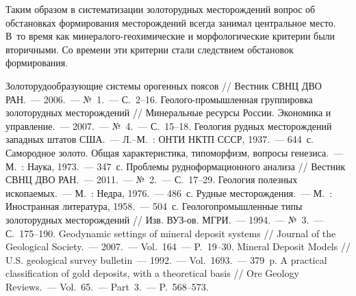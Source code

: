 Таким образом в систематизации золоторудных месторождений вопрос об обстановках формирования месторождений всегда занимал центральное место. В~то время как минералого-геохимические и морфологические критерии были вторичными. Со времени эти критерии стали следствием обстановок формирования.

\begin{thebibliography}{99}
\bibitem{} Золоторудообразующие системы орогенных поясов // Вестник СВНЦ ДВО РАН.~--- 2006.~--- №~1.~--- С.~2--16.
\bibitem{} Геолого-промышленная группировка золоторудных месторождений // Минеральные ресурсы России. Экономика и управление.~--- 2007.~--- №~4.~--- С.~15--18.
\bibitem{} Геология рудных месторождений западных штатов США.~--- Л.--М.~: ОНТИ НКТП СССР, 1937.~--- 644~с.
\bibitem{} Самородное золото. Общая характеристика, типоморфизм, вопросы генезиса.~--- М.~: Наука, 1973.~--- 347~с.
\bibitem{} Проблемы рудноформационного анализа // Вестник СВНЦ ДВО РАН.~--- 2011.~--- №~2.~--- С.~17--29.
\bibitem{} Геология полезных ископаемых.~--- М.~: Недра, 1976.~--- 486~с.
\bibitem{} Рудные месторождения.~--- М.~: Иностранная литература, 1958.~--- 504~с.
\bibitem{} Геологопромышленные типы золоторудных месторождений // Изв. ВУЗ-ов. МГРИ.~--- 1994.~--- №~3.~--- С.~175--190.
\bibitem{} Geodynamic settings of mineral deposit systems // Journal of the Geological Society.~--- 2007.~--- Vol.~164~--- P.~19--30.
\bibitem{} Mineral Deposit Models // U.S. geological survey bulletin~--- 1992.~--- Vol.~1693.~--- 379~p.
\bibitem{} A practical classification of gold deposits, with a theoretical basis // Ore Geology Reviews.~--- Vol.~65.~--- Part~3.~--- P.~568--573.
\end{thebibliography}
\thispagestyle{empty}
